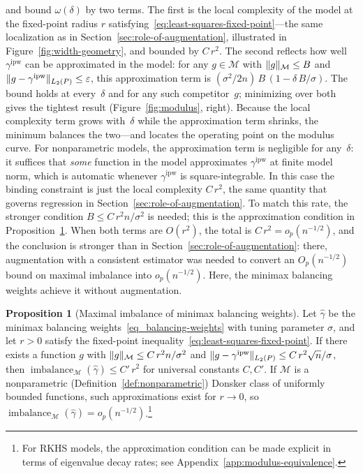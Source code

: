 \documentclass{article}
\DeclarePairedDelimiter\norm{\lVert}{\rVert}
\theoremstyle{definition}
\newtheorem{proposition}[theorem]{Proposition}
\newcommand{\ipw}{\text{ipw}}
\DeclareMathOperator{\imbalance}{imbalance}
\newcommand{\hgamma}{\ensuremath{\hat\gamma}}
\newcommand{\gammaipw}{\ensuremath{\gamma^{\ipw}}}
\newcommand{\model}{\mathcal{M}}
\newcommand{\<}{\langle}
\renewcommand{\>}{\rangle}
\begin{document}
\citet{kong2025asymptotics} and \citet{hirshberg2026bregman} bound $\omega(\delta)$ by two terms. The first is the local complexity of the model at the fixed-point radius $r$ satisfying~\eqref{eq:least-squares-fixed-point}---the same localization as in Section~\ref{sec:role-of-augmentation}, illustrated in Figure~\ref{fig:width-geometry}, and bounded by $C\,r^2$. The second reflects how well $\gammaipw$ can be approximated in the model: for any $g \in \model$ with $\norm{g}_\model \le B$ and $\norm{g - \gammaipw}_{L_2(P)} \le \varepsilon$, this approximation term is $(\sigma^2/2n)\,B\,(1 - \delta\,B/\sigma)$. The bound holds at every~$\delta$ and for any such competitor~$g$; minimizing over both gives the tightest result (Figure~\ref{fig:modulus}, right). Because the local complexity term grows with~$\delta$ while the approximation term shrinks, the minimum balances the two---and locates the operating point on the modulus curve. For nonparametric models, the approximation term is negligible for any~$\delta$: it suffices that \emph{some} function in the model approximates $\gammaipw$ at finite model norm, which is automatic whenever $\gammaipw$ is square-integrable. In this case the binding constraint is just the local complexity $C\,r^2$, the same quantity that governs regression in Section~\ref{sec:role-of-augmentation}. To match this rate, the stronger condition $B \le C\,r^2 n/\sigma^2$ is needed; this is the approximation condition in Proposition~\ref{prop:bias-balance}. When both terms are $O(r^2)$, the total is $C\,r^2 = o_p(n^{-1/2})$, and the conclusion is stronger than in Section~\ref{sec:role-of-augmentation}: there, augmentation with a consistent estimator was needed to convert an $O_p(n^{-1/2})$ bound on maximal imbalance into $o_p(n^{-1/2})$. Here, the minimax balancing weights achieve it without augmentation.

\begin{proposition}[Maximal imbalance of minimax balancing weights]
\label{prop:bias-balance}
Let $\hgamma$ be the minimax balancing weights~\eqref{eq_balancing-weights} with tuning parameter $\sigma$,
and let $r > 0$ satisfy the fixed-point inequality~\eqref{eq:least-squares-fixed-point}. If there exists a function $g$ with $\norm{g}_\model \le C\, r^2 n / \sigma^2$ and $\norm{g - \gammaipw}_{L_2(P)} \le C\, r^2 \sqrt{n}/\sigma$, then $\imbalance_\model(\hgamma) \le C'\, r^2$ for universal constants $C, C'$. If $\model$ is a nonparametric (Definition~\ref{def:nonparametric}) Donsker class of uniformly bounded functions, such approximations exist for $r \to 0$, so $\imbalance_\model(\hgamma) = o_p(n^{-1/2})$.\footnote{For RKHS models, the approximation condition can be made explicit in terms of eigenvalue decay rates; see Appendix~\ref{app:modulus-equivalence}.}
\end{proposition}
\end{document}
